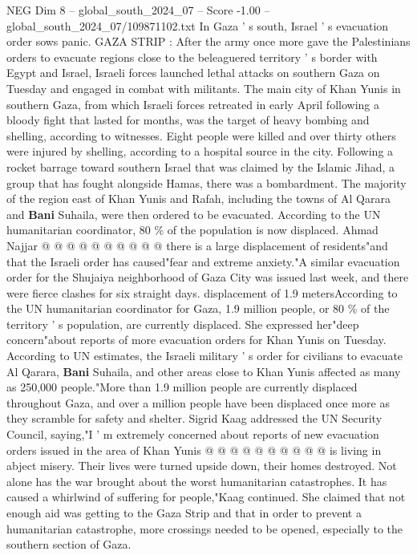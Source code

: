 \begin{textsample}{NEG Dim 8 – global\_south\_2024\_07 – Score -1.00 – global\_south\_2024\_07/109871102.txt}  \label{ex:f8_neg_357}
In Gaza ' s south, Israel ' s evacuation order sows panic.
GAZA STRIP : After the army once more gave the Palestinians orders to evacuate regions close to the beleaguered territory ' s border with Egypt and Israel, Israeli forces launched lethal attacks on southern Gaza on Tuesday and engaged in combat with militants.
The main city of Khan Yunis in southern Gaza, from which Israeli forces retreated in early April following a bloody fight that lasted for months, was the target of heavy bombing and shelling, according to witnesses.
Eight people were killed and over thirty others were injured by shelling, according to a hospital source in the city.
Following a rocket barrage toward southern Israel that was claimed by the Islamic Jihad, a group that has fought alongside Hamas, there was a bombardment.
The majority of the region east of Khan Yunis and Rafah, including the towns of Al Qarara and \textbf{Bani} Suhaila, were then ordered to be evacuated.
According to the UN humanitarian coordinator, 80 \% of the population is now displaced.
Ahmad Najjar @ @ @ @ @ @ @ @ @ @ there is a large displacement of residents"and that the Israeli order has caused"fear and extreme anxiety."A similar evacuation order for the Shujaiya neighborhood of Gaza City was issued last week, and there were fierce clashes for six straight days. displacement of 1.9 metersAccording to the UN humanitarian coordinator for Gaza, 1.9 million people, or 80 \% of the territory ' s population, are currently displaced.
She expressed her"deep concern"about reports of more evacuation orders for Khan Yunis on Tuesday.
According to UN estimates, the Israeli military ' s order for civilians to evacuate Al Qarara, \textbf{Bani} Suhaila, and other areas close to Khan Yunis affected as many as 250,000 people."More than 1.9 million people are currently displaced throughout Gaza, and over a million people have been displaced once more as they scramble for safety and shelter.
Sigrid Kaag addressed the UN Security Council, saying,"I ' m extremely concerned about reports of new evacuation orders issued in the area of Khan Yunis @ @ @ @ @ @ @ @ @ @ is living in abject misery.
Their lives were turned upside down, their homes destroyed.
Not alone has the war brought about the worst humanitarian catastrophes.
It has caused a whirlwind of suffering for people,"Kaag continued.
She claimed that not enough aid was getting to the Gaza Strip and that in order to prevent a humanitarian catastrophe, more crossings needed to be opened, especially to the southern section of Gaza.

\end{textsample}

